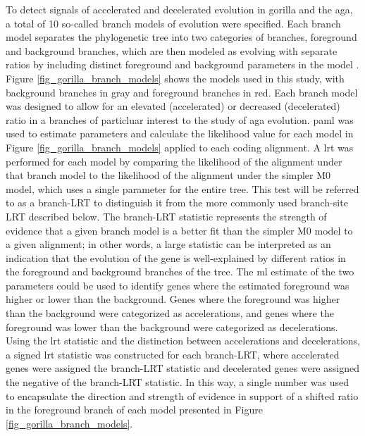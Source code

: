 To detect signals of accelerated and decelerated evolution in gorilla
and the \ac{aga}, a total of 10 so-called branch models of evolution
were specified. Each branch model separates the phylogenetic tree into
two categories of branches, foreground and background branches, which
are then modeled as evolving with separate \dnds ratios by including
distinct foreground and background \omg parameters in the model
\citep{Yang1998,Yang1998a}. Figure \ref{fig_gorilla_branch_models}
shows the models used in this study, with background branches in gray
and foreground branches in red. Each branch model was designed to
allow for an elevated (accelerated) or decreased (decelerated) \dnds
ratio in a branches of particluar interest to the study of \ac{aga}
evolution. \ac{paml} was used to estimate parameters and calculate the
likelihood value for each model in Figure
\ref{fig_gorilla_branch_models} applied to each coding alignment. A
\ac{lrt} was performed for each model by comparing the likelihood of
the alignment under that branch model to the likelihood of the
alignment under the simpler M0 model, which uses a single \omg
parameter for the entire tree. This test will be referred to as a
branch-LRT to distinguish it from the more commonly used branch-site
LRT described below. The branch-LRT statistic represents the strength
of evidence that a given branch model is a better fit than the simpler
M0 model to a given alignment; in other words, a large statistic can
be interpreted as an indication that the evolution of the gene is
well-explained by different \dnds ratios in the foreground and
background branches of the tree. The \ac{ml} estimate of the two \omg
parameters could be used to identify genes where the estimated
foreground \omg was higher or lower than the background. Genes where
the foreground \omg was higher than the background were categorized as
accelerations, and genes where the foreground \omg was lower than the
background were categorized as decelerations. Using the \ac{lrt}
statistic and the distinction between accelerations and decelerations,
a signed \ac{lrt} statistic was constructed for each branch-LRT, where
accelerated genes were assigned the branch-LRT statistic and
decelerated genes were assigned the negative of the branch-LRT
statistic. In this way, a single number was used to encapsulate the
direction and strength of evidence in support of a shifted \dnds ratio
in the foreground branch of each model presented in Figure
\ref{fig_gorilla_branch_models}.

